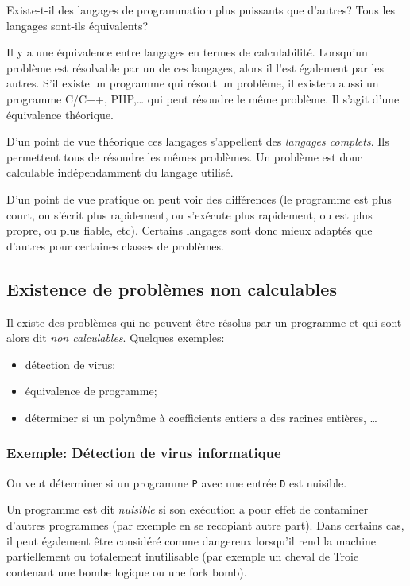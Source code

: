Existe-t-il des langages de programmation plus puissants que d'autres? Tous les langages sont-ils équivalents?

Il y a une équivalence entre langages en termes de calculabilité.  Lorsqu'un problème est résolvable par un de ces langages, alors il l'est également par les autres.
S'il existe un programme \java qui résout un problème, il existera aussi un programme C/C++, PHP,\ldots{} qui peut résoudre le même problème. Il s'agit d'une équivalence théorique.

D'un point de vue théorique ces langages s'appellent des \emph{langages complets}. Ils permettent tous de résoudre les mêmes problèmes. Un problème est donc calculable indépendamment du langage utilisé.

D'un point de vue pratique on peut voir des différences (le programme est plus court, ou s'écrit plus rapidement, ou s'exécute plus rapidement, ou est plus propre, ou plus fiable, etc). Certains langages sont donc mieux adaptés que d'autres pour certaines classes de problèmes.


\subsection{Existence de problèmes non calculables}
\label{subsec:existence_de_problemes_non_calculables}

Il existe des problèmes qui ne peuvent être résolus par un programme et qui sont alors dit \emph{non calculables}.
Quelques exemples:
\begin{itemize}
	\item détection de virus;
	\item équivalence de programme;
	\item déterminer si un polynôme à coefficients entiers a des racines entières, \ldots
\end{itemize}


\subsubsection{Exemple: Détection de virus informatique}
\label{subsubsec:detection_de_virus_informatique}
On veut déterminer si un programme \lstinline|P| avec une entrée \lstinline|D| est nuisible.

\begin{mydef}
	Un programme est dit \emph{nuisible} si son exécution a pour effet de contaminer d'autres programmes (par exemple en se recopiant autre part). Dans certains cas, il peut également être considéré comme dangereux lorsqu'il rend la machine partiellement ou totalement inutilisable (par exemple un cheval de Troie contenant une bombe logique ou une fork bomb).
\end{mydef}

